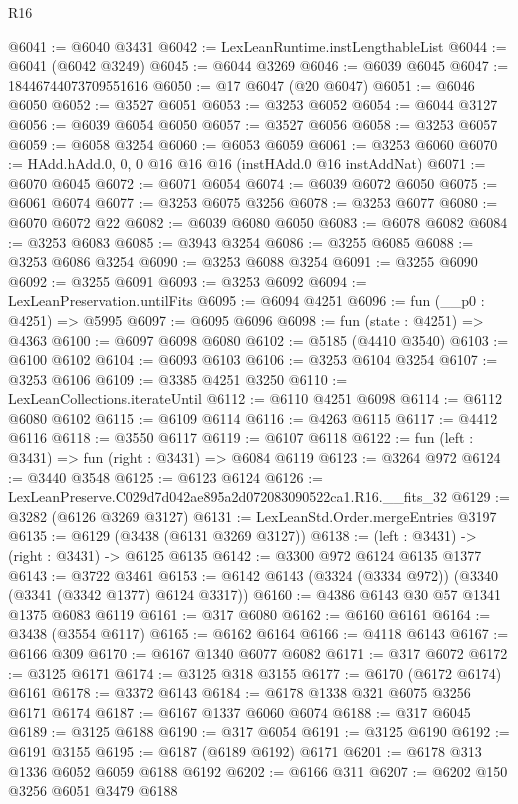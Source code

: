 \begin{lexlean}{R16}
\begin{coremodule}
@6041 := @6040 @3431
@6042 := LexLeanRuntime.instLengthableList
@6044 := @6041 (@6042 @3249)
@6045 := @6044 @3269
@6046 := @6039 @6045
@6047 := 18446744073709551616
@6050 := @17 @6047 (@20 @6047)
@6051 := @6046 @6050
@6052 := @3527 @6051
@6053 := @3253 @6052
@6054 := @6044 @3127
@6056 := @6039 @6054 @6050
@6057 := @3527 @6056
@6058 := @3253 @6057
@6059 := @6058 @3254
@6060 := @6053 @6059
@6061 := @3253 @6060
@6070 := HAdd.hAdd.{0, 0, 0} @16 @16 @16 (instHAdd.{0} @16 instAddNat)
@6071 := @6070 @6045
@6072 := @6071 @6054
@6074 := @6039 @6072 @6050
@6075 := @6061 @6074
@6077 := @3253 @6075 @3256
@6078 := @3253 @6077
@6080 := @6070 @6072 @22
@6082 := @6039 @6080 @6050
@6083 := @6078 @6082
@6084 := @3253 @6083
@6085 := @3943 @3254
@6086 := @3255 @6085
@6088 := @3253 @6086 @3254
@6090 := @3253 @6088 @3254
@6091 := @3255 @6090
@6092 := @3255 @6091
@6093 := @3253 @6092
@6094 := LexLeanPreservation.untilFits
@6095 := @6094 @4251
@6096 := fun (__p0 : @4251) => @5995
@6097 := @6095 @6096
@6098 := fun (state : @4251) => @4363
@6100 := @6097 @6098 @6080
@6102 := @5185 (@4410 @3540)
@6103 := @6100 @6102
@6104 := @6093 @6103
@6106 := @3253 @6104 @3254
@6107 := @3253 @6106
@6109 := @3385 @4251 @3250
@6110 := LexLeanCollections.iterateUntil
@6112 := @6110 @4251 @6098
@6114 := @6112 @6080 @6102
@6115 := @6109 @6114
@6116 := @4263 @6115
@6117 := @4412 @6116
@6118 := @3550 @6117
@6119 := @6107 @6118
@6122 := fun (left : @3431) => fun (right : @3431) => @6084 @6119
@6123 := @3264 @972
@6124 := @3440 @3548
@6125 := @6123 @6124
@6126 := LexLeanPreserve.C029d7d042ae895a2d072083090522ca1.R16.__fits_32
@6129 := @3282 (@6126 @3269 @3127)
@6131 := LexLeanStd.Order.mergeEntries @3197
@6135 := @6129 (@3438 (@6131 @3269 @3127))
@6138 := (left : @3431) -> (right : @3431) -> @6125 @6135
@6142 := @3300 @972 @6124 @6135 @1377
@6143 := @3722 @3461
@6153 := @6142 @6143 (@3324 (@3334 @972)) (@3340 (@3341 (@3342 @1377) @6124 @3317))
@6160 := @4386 @6143 @30 @57 @1341 @1375 @6083 @6119
@6161 := @317 @6080
@6162 := @6160 @6161
@6164 := @3438 (@3554 @6117)
@6165 := @6162 @6164
@6166 := @4118 @6143
@6167 := @6166 @309
@6170 := @6167 @1340 @6077 @6082
@6171 := @317 @6072
@6172 := @3125 @6171
@6174 := @3125 @318 @3155
@6177 := @6170 (@6172 @6174) @6161
@6178 := @3372 @6143
@6184 := @6178 @1338 @321 @6075 @3256 @6171 @6174
@6187 := @6167 @1337 @6060 @6074
@6188 := @317 @6045
@6189 := @3125 @6188
@6190 := @317 @6054
@6191 := @3125 @6190
@6192 := @6191 @3155
@6195 := @6187 (@6189 @6192) @6171
@6201 := @6178 @313 @1336 @6052 @6059 @6188 @6192
@6202 := @6166 @311
@6207 := @6202 @150 @3256 @6051 @3479 @6188

\end{coremodule}
\end{lexlean}
